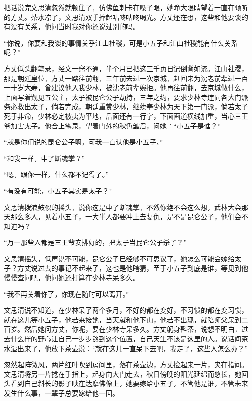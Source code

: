 把话说完文思清忽然就顿住了，仿佛鱼刺卡在嗓子眼，她睁大眼睛望着一直在倾听的方丈。茶水凉了，文思清双手捧起咕咚咕咚喝光。方丈还在想，这些和他要谈的有没有关系，他问当时我对你还说过别的吗。

“你说，你要和我谈的事情关乎江山社稷，可是小五子和江山社稷能有什么关系呢？”

方丈低头翻笔录，经文一窍不通，半个月已把这三千页日记倒背如流。江山社稷，那是朝廷皇位，方丈一路往前翻，三年前去过一次京城，赶回来为沈老前辈过一百一十岁大寿，曾建议他入我少林，被沈老前辈婉拒。他再往前翻，去京城做什么，上面写着觐见五公主，太子被昆仑公子劫持，三年之约，要求少林寺连同各大门派务必救出太子，倘若完成，朝廷重赏少林，继续奉少林为天下第一门派，倘若太子死于非命，少林必定被夷为平地，后面还有一行字，下面画道横线加重，当心三王爷加害太子。他合上笔录，望着门外的秋色皱眉，问她：“小五子是谁？”

“就是你们说的昆仑公子啊，可我一直认他是小五子。”

“和我一样，中了断魂掌？”

“嗯，跟你一样，什么都不记得了。”

“有没有可能，小五子其实是太子？”

文思清拨浪鼓似的摇头，说你这是中了断魂掌，不然你绝不会这么想，武林大会那天那么多人，见着小五子，一大半人都要冲上去复仇，是不是昆仑公子，他们会不知道吗？

“万一那些人都是三王爷安排好的，把太子当昆仑公子杀了？”

文思清摇头，低声说不可能，昆仑公子已经够不可思议了，她怎么可能会嫁给太子？方丈说过去的事记不起来了，这也是他瞎猜，至于小五子到底是谁，等见到他慢慢查问吧，他问她还打算在少林寺呆多久。

“我不再关着你了，你现在随时可以离开。”

文思清说不知道，在少林呆了两个多月，不好的都在变好，不习惯的都在变习惯，就在这儿等小五子，他若来接她，当天就和他下山，他若不出现，就陪师父呆到二百岁。然后她问方丈，你呢，要在少林寺呆多久。方丈躬身斟茶，说想不明白，过去什么样的野心让自己一步步熬到这个位置，自己天生不该是这里的人。说话间茶水溢出来了，他放下茶壶说：“就在这儿一直呆下去吧，我走了，这些人怎么办？”

忽然起阵微风，两片红叶吹到房间里，落在茶壶边，方丈捡起来一片，夹在指间。文思清将另一片捻在手指上，起身向大门走去，秋日傍晚的阳光延绵而悠长，她回头看到自己斜长的影子映在达摩佛像上，她要嫁给小五子，不管他是谁，不管未来发生什么事，一辈子总要嫁给他一回。

\newpage